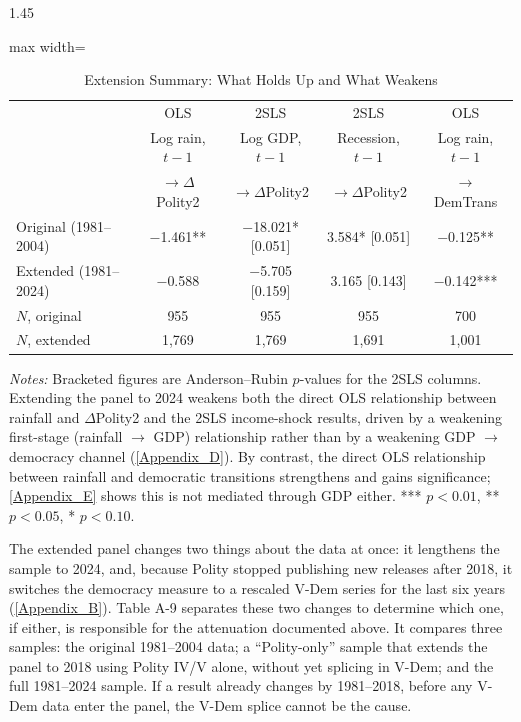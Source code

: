 \documentclass[12pt]{article}
\begin{document}
\begin{bibunit}[jpe]
\begin{spacing}{1.45}
\begin{table}[H]
\centering
\begin{adjustbox}{max width=\textwidth}
\begin{threeparttable}
\caption{Extension Summary: What Holds Up and What Weakens}
\label{tab:A8}
\begin{tabular}{lcccc}
\toprule
 & OLS & 2SLS & 2SLS & OLS \\
 & Log rain, $t-1$ & Log GDP, $t-1$ & Recession, $t-1$ & Log rain, $t-1$ \\
 & $\to \Delta$Polity2 & $\to \Delta$Polity2 & $\to \Delta$Polity2 & $\to$ DemTrans \\
\midrule
Original (1981--2004) & $-$1.461** & $-$18.021* [0.051] & 3.584* [0.051] & $-$0.125** \\
Extended (1981--2024) & $-$0.588   & $-$5.705 [0.159]   & 3.165 [0.143]  & $-$0.142*** \\
\midrule
$N$, original  & 955   & 955 & 955 & 700 \\
$N$, extended  & 1{,}769 & 1{,}769 & 1{,}691 & 1{,}001 \\
\bottomrule
\end{tabular}
\begin{tablenotes}[flushleft]
\footnotesize
\item \textit{Notes:} Bracketed figures are Anderson--Rubin $p$-values for the 2SLS columns. Extending the panel to 2024 weakens both the direct OLS relationship between rainfall and $\Delta$Polity2 and the 2SLS income-shock results, driven by a weakening first-stage (rainfall $\to$ GDP) relationship rather than by a weakening GDP $\to$ democracy channel (\ref{Appendix_D}). By contrast, the direct OLS relationship between rainfall and democratic transitions strengthens and gains significance; \ref{Appendix_E} shows this is not mediated through GDP either. *** $p<0.01$, ** $p<0.05$, * $p<0.10$.
\end{tablenotes}
\end{threeparttable}
\end{adjustbox}
\end{table}

The extended panel changes two things about the data at once: it lengthens the sample to 2024, and, because Polity stopped publishing new releases after 2018, it switches the democracy measure to a rescaled V-Dem series for the last six years (\ref{Appendix_B}). Table A-9 separates these two changes to determine which one, if either, is responsible for the attenuation documented above. It compares three samples: the original 1981--2004 data; a ``Polity-only'' sample that extends the panel to 2018 using Polity IV/V alone, without yet splicing in V-Dem; and the full 1981--2024 sample. If a result already changes by 1981--2018, before any V-Dem data enter the panel, the V-Dem splice cannot be the cause.


\end{spacing}
\end{bibunit}
\end{document}
